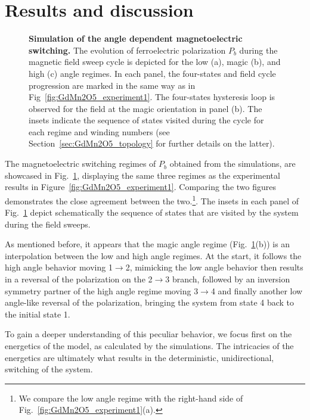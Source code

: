\section{Results and discussion \label{sec:GdMn2O5_results_discussion}}
\begin{figure}
    \caption{\label{fig:GdMn2O5_theory}{\bf Simulation of the angle dependent magnetoelectric switching.}
    The evolution of ferroelectric polarization $P_b$ during the magnetic field sweep cycle is depicted for the low (a), magic (b), and high (c) angle regimes. 
   In each panel, the four-states and field cycle progression are marked in the same way as in Fig~\ref{fig:GdMn2O5_experiment1}. The four-states hysteresis loop is observed for the field at the magic orientation in panel (b). 
    The insets indicate the sequence of states visited during the cycle for each regime and winding numbers (see Section~\ref{sec:GdMn2O5_topology} for further details on the latter).
}
\end{figure}
The magnetoelectric switching regimes of $P_b$ obtained from the simulations, are showcased in Fig.~\ref{fig:GdMn2O5_theory}, displaying the same three regimes as the experimental results in Figure~\ref{fig:GdMn2O5_experiment1}.
Comparing the two figures demonstrates the close agreement between the two.\footnote{We compare the low angle regime with the right-hand side of Fig.~\ref{fig:GdMn2O5_experiment1}(a).}.
The insets in each panel of Fig.~\ref{fig:GdMn2O5_theory} depict schematically the sequence of states that are visited by the system during the field sweeps.

As mentioned before, it appears that the magic angle regime (Fig.~\ref{fig:GdMn2O5_theory}(b)) is an interpolation between the low and high angle regimes.
At the start, it follows the high angle behavior moving 1$\rightarrow$2, mimicking the low angle behavior then results in a reversal of the polarization on the 2$\rightarrow$3 branch, followed by an inversion symmetry partner of the high angle regime moving 3$\rightarrow$4 and finally another low angle-like reversal of the polarization, bringing the system from state 4 back to the initial state 1. 

To gain a deeper understanding of this peculiar behavior, we focus first on the energetics of the model, as calculated by the simulations.
The intricacies of the energetics are ultimately what results in the deterministic, unidirectional, switching of the system.

